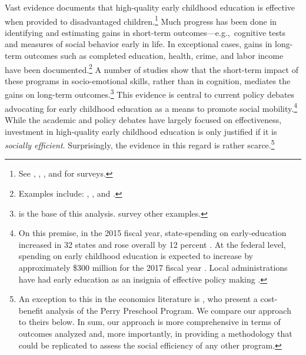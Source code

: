 \noindent Vast evidence documents that high-quality early childhood education is effective when provided to disadvantaged children.\footnote{See \citet{Blau_Currie_2006_HEE}, \citet{Duncan_Magnuson_2013_JEP}, \citet{Almond-Currie_2011_JEP}, and \citet{Elango_Hojman_etal_2016_Early-Edu} for surveys.}  Much progress has been done in identifying and estimating gains in short-term outcomes---e.g.,\ cognitive tests and measures of social behavior early in life. In exceptional cases, gains in long-term outcomes such as completed education, health, crime, and labor income have been documented.\footnote{Examples include: \citet{Heckman_Moon_etal_2010_QE}, \citet{Havnes_Mogstad_2011_AEJEP}, and \citet{Campbell_Conti_etal_2014_EarlyChildhoodInvestments}.} A number of studies show that the short-term impact of these programs in socio-emotional skills, rather than in cognition, mediates the gains on long-term outcomes.\footnote{\citet{Heckman_Pinto_etal_2013_PerryFactor} is the base of this analysis. \citet{Almond_etal_2017_Childhood_UNPUBLISHED} survey other examples.} This evidence is central to current policy debates advocating for early childhood education as a means to promote social mobility.\footnote{On this premise, in the 2015 fiscal year, state-spending on early-education increased in 32 states and rose overall by 12 percent \citep{Parker-etal_2016_50-State-Review}. At the federal level, spending on early childhood education is expected to increase by approximately \$300 million for the 2017 fiscal year \citep{US-Gov_2016_Budget,Smith_2016_Early-Learning-Budget}. Local administrations have had early education as an insignia of effective policy making \citep{Mayor_NY_2014_NYC_ECE-Plan_DOE}.} While the academic and policy debates have largely focused on effectiveness, investment in high-quality early childhood education is only justified if it is \textit{socially efficient}. Surprisingly, the evidence in this regard is rather scarce.\footnote{An exception to this in the economics literature is \citet{Heckman_Moon_etal_2010_RateofReturn}, who present a cost-benefit analysis of the Perry Preschool Program. We compare our approach to theirs below. In sum, our approach is more comprehensive in terms of outcomes analyzed and, more importantly, in providing a methodology that could be replicated to assess the social efficiency of any other program.}\\

